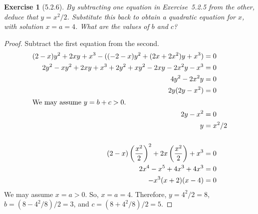 \documentclass[12pt]{article}
\theoremstyle{plain}
\newtheorem{ex}{Exercise}
\begin{document}
\begin{ex} [5.2.6]
  By subtracting one equation in Exercise~5.2.5 from the other, deduce that $y=x^2/2$. Substitute this back to obtain a quadratic equation for $x$, with solution $x=a=4$. What are the values of $b$ and $c$?
\end{ex}

\begin{proof}
  Subtract the first equation from the second.
  \begin{align*}
    (2-x)y^2+2xy+x^3-((-2-x)y^2+(2x+2x^2)y+x^3)                         &= 0 \\
    2y^2-xy^2+2xy+x^3+2y^2+xy^2-2xy-2x^2y-x^3                           &= 0 \\
    4y^2-2x^2y                                                          &= 0 \\
    2y(2y-x^2)                                                          &= 0 \\
    \intertext{We may assume $y=b+c>0$.}
    2y-x^2                                                              &= 0 \\
    y                                                                   &= x^2/2 \\
    \\
    (2-x)\left(\frac{x^2}{2}\right)^2+2x\left(\frac{x^2}{2}\right)+x^3  &= 0 \\
    2x^4-x^5+4x^3+4x^3                                                  &= 0 \\
    -x^3(x+2)(x-4)                                                      &= 0
  \end{align*}
  We may assume $x=a>0$. So, $x=a=4$. Therefore, $y=4^2/2=8$, $b=(8-4^2/8)/2=3$, and $c=(8+4^2/8)/2=5$.
\end{proof}
\end{document}
